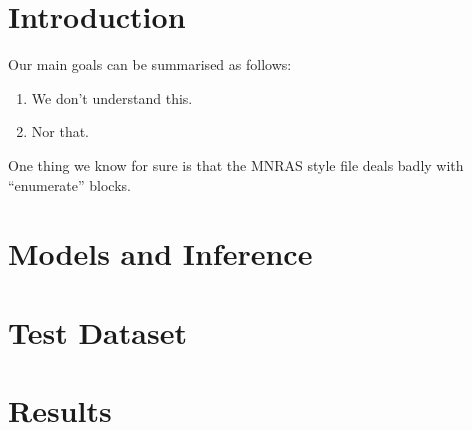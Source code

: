 \documentclass[useAMS,usenatbib]{mn2e}
\begin{document}

\section{Introduction}
\label{sec:intro}

Our main goals can be summarised as follows:

\begin{enumerate}

\item We don't understand this.

\item Nor that.

\end{enumerate}

One thing we know for sure is that the MNRAS style file deals badly
with ``enumerate'' blocks.


\section{Models and Inference}
\label{sec:model}



\section{Test Dataset}
\label{sec:data}



\section{Results}
\label{sec:results}


\end{document}
